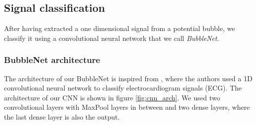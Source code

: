 		
		\subsection{Signal classification}
		After having extracted a one dimensional signal from a potential bubble, we classify it using a convolutional neural network that we call \textit{BubbleNet}. 

		\subsubsection{BubbleNet architecture}		
		The architecture of our BubbleNet is inspired from \citet{Li}, where the authors used a 1D convolutional neural network to classify electrocardiogram signals (ECG). The architecture of our CNN is shown in figure \ref{fig:cnn_arch}. We used two convolutional layers with MaxPool layers in between and two dense layers, where the last dense layer is also the output. 
		
